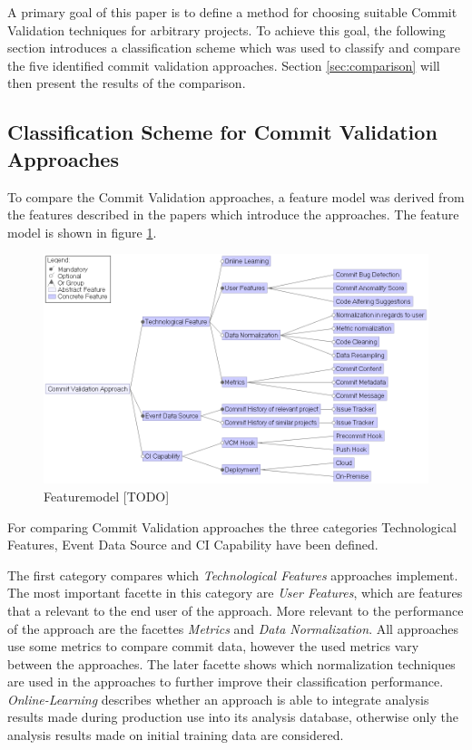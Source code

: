 A primary goal of this paper is to define a method for choosing suitable Commit Validation techniques for arbitrary projects. To achieve this goal, the following section introduces a classification scheme which was used to classify and compare the five identified commit validation approaches. Section \ref{sec:comparison} will then present the results of the comparison.

\subsection{Classification Scheme for Commit Validation Approaches}
\label{sec:scheme}

To compare the Commit Validation approaches, a feature model was derived from the features described in the papers which introduce the approaches. The feature model is shown in figure \ref{fig:featuremodel}.

\begin{figure}[h]
	\centering
	\includegraphics[width=15cm]{images/featuremodel}
	\caption{Featuremodel [TODO]}
	\label{fig:featuremodel}
\end{figure}

For comparing Commit Validation approaches the three categories Technological Features, Event Data Source and CI Capability have been defined.

The first category compares which \textit{Technological Features} approaches implement. The most important facette in this category are \textit{User Features}, which are features that a relevant to the end user of the approach. 
More relevant to the performance of the approach are the facettes \textit{Metrics} and \textit{Data Normalization}. All approaches use some metrics to compare commit data, however the used metrics vary between the approaches.
The later facette shows which normalization techniques are used in the approaches to further improve their classification performance.
\textit{Online-Learning} describes whether an approach is able to integrate analysis results made during production use into its analysis database, otherwise only the analysis results made on initial training data are considered. 

